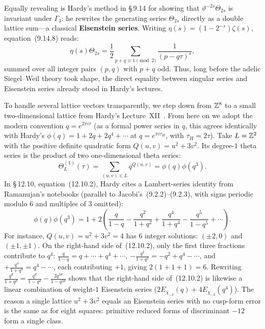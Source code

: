 Equally revealing is Hardy's method in \S\,9.14 for showing that $\vartheta^{-2s}\Theta_{2s}$ is invariant under $\Gamma_3$: he rewrites the generating series $\Theta_{2s}$ directly as a double lattice sum---a classical \textbf{Eisenstein series}. Writing $\eta(s)=(1-2^{-s})\zeta(s)$, equation~(9.14.8) reads:
\begin{equation*}\tag{9.14.8}
\eta(s)\Theta_{2s}=\frac{1}{2}\sum_{p+q\equiv 1\pmod 2}\frac{1}{(p-q\tau)^s},
\end{equation*}
summed over all integer pairs $(p,q)$ with $p+q$ odd. Thus, long before the adelic Siegel--Weil theory took shape, the direct equality between singular series and Eisenstein series already stood in Hardy's lectures.

To handle several lattice vectors transparently, we step down from $\mathbb{Z}^8$ to a small two-dimensional lattice from Hardy's Lecture~XII~\cite[\S\,12.2 and \S\,12.10, pp.~213, 220]{Hardy1940}. From here on we adopt the modern convention $q=e^{2\pi i\tau}$ (as a formal power series in $q$, this agrees identically with Hardy's $\phi(q)=1+2q+2q^4+\cdots$ at $q=e^{\pi i\tau_H}$, with $\tau_H=2\tau$). Take $L=\mathbb{Z}^2$ with the positive definite quadratic form $Q(u,v)=u^2+3v^2$. Its degree-$1$ theta series is the product of two one-dimensional theta series:
\[
\Theta_L^{(1)}(\tau)=\sum_{(u,v)\in L}q^{Q(u,v)}=\phi(q)\phi(q^3).
\]
In \S\,12.10, equation~(12.10.2), Hardy cites a Lambert-series identity from Ramanujan's notebooks (parallel to Jacobi's~(9.2.2)--(9.2.3), with signs periodic modulo $6$ and multiples of $3$ omitted):
\begin{equation*}\tag{12.10.2}
\phi(q)\phi(q^3)=1+2\left(\frac{q}{1-q}-\frac{q^2}{1+q^2}+\frac{q^4}{1+q^4}-\frac{q^5}{1-q^5}+\cdots\right).
\end{equation*}
For instance, $Q(u,v)=u^2+3v^2=4$ has $6$ integer solutions: $(\pm 2,0)$ and $(\pm 1,\pm 1)$. On the right-hand side of~(12.10.2), only the first three fractions contribute to $q^4$: $\frac{q}{1-q}=q+\cdots+q^4+\cdots$, $-\frac{q^2}{1+q^2}=-q^2+q^4-\cdots$, and $+\frac{q^4}{1+q^4}=q^4-\cdots$, each contributing $+1$, giving $2(1+1+1)=6$. Rewriting $\frac{q^d}{1+q^d}=\frac{q^d}{1-q^d}-\frac{2q^{2d}}{1-q^{2d}}$ shows that the right-hand side of~(12.10.2) is likewise a linear combination of weight-$1$ Eisenstein series ($2E_{\chi_{-3}}(q)+4E_{\chi_{-3}}(q^4)$). The reason a single lattice $u^2+3v^2$ equals an Eisenstein series with no cusp-form error is the same as for eight squares: primitive reduced forms of discriminant $-12$ form a single class.

